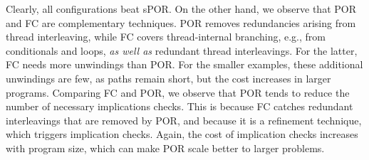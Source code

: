 \documentclass[conference]{IEEEtran}
\begin{document}
Clearly, all configurations beat sPOR. On the other hand, we observe that POR and FC are
complementary techniques.  POR removes redundancies arising from thread
interleaving, while FC covers thread-internal branching, e.g., from
conditionals and loops, \emph{as well as} redundant thread interleavings. 
For the latter, FC needs more unwindings than POR.  For the smaller
examples, these additional unwindings are few, as paths remain short,
but the cost increases in larger programs.  Comparing FC and POR, we observe
that POR tends to reduce the number of necessary implications checks.  This
is because FC catches redundant interleavings that are removed by POR, and
because it is a refinement technique, which triggers implication checks. 
Again, the cost of implication checks increases with program size, which can
make POR scale better to larger problems.
\end{document}
